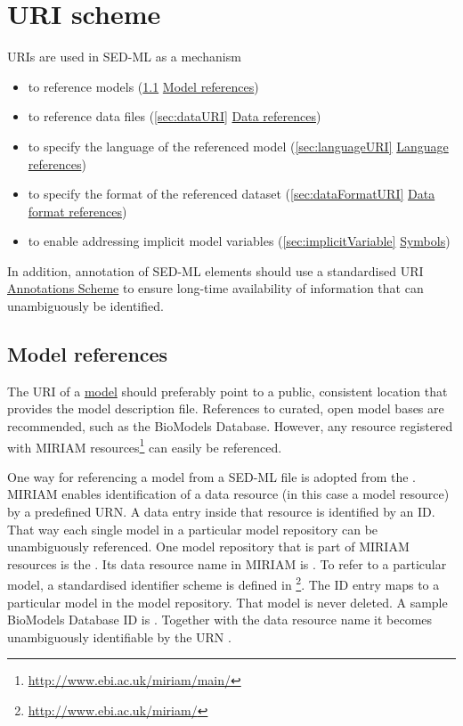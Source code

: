 \section{URI scheme}  
\label{sec:uriScheme}
URIs are used in SED-ML as a mechanism
\begin{itemize}
	\item to reference models (\ref{sec:modelURI} \hyperref[sec:modelURI]{Model references})
	\item to reference data files (\ref{sec:dataURI} \hyperref[sec:dataURI]{Data references})
	\item to specify the language of the referenced model (\ref{sec:languageURI} \hyperref[sec:languageURI]{Language references})
	\item to specify the format of the referenced dataset (\ref{sec:dataFormatURI} \hyperref[sec:dataFormatURI]{Data format references})
	\item to enable addressing implicit model variables (\ref{sec:implicitVariable}  \hyperref[sec:implicitVariable]{Symbols})
\end{itemize}

In addition, annotation of SED-ML elements should use a standardised URI \hyperref[sec:annotations]{Annotations Scheme} to ensure long-time availability of information that can unambiguously be identified.


\subsection{Model references}
\label{sec:modelURI}
The URI of a \hyperref[class:model]{model} should preferably point to a public, consistent location that provides the model description file. References to curated, open model bases are recommended, such as the BioModels Database. However, any resource registered with MIRIAM resources\footnote{\url{http://www.ebi.ac.uk/miriam/main/}} can easily be referenced.

One way for referencing a model from a SED-ML file is adopted from the . MIRIAM enables identification of a data resource (in this case a model resource) by a predefined URN. A data entry inside that resource is identified by an ID. That way each single  model in a particular model repository can be unambiguously referenced. One model repository that is part of MIRIAM resources is the  \citep{LDR+10}. Its data resource name in MIRIAM is . To refer to a particular model, a standardised identifier scheme is defined in \footnote{\url{http://www.ebi.ac.uk/miriam/}}. The ID entry maps to a particular model in the model repository. That model is never deleted. A sample BioModels Database ID is . Together with the data resource name it becomes unambiguously identifiable by the URN . 

